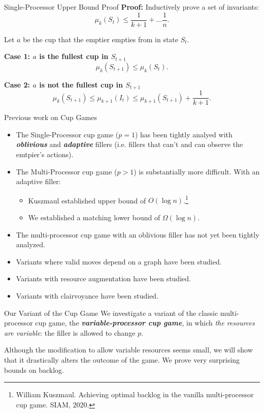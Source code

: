 \documentclass[xcolor=x11names, svgnames, rgb]{beamer}
\newcommand{\defn}[1]       {{\textit{\textbf{\boldmath #1}}}}
\begin{document}
\begin{frame}[t]{Single-Processor Upper Bound Proof}
  \textbf{Proof:}
  Inductively prove a set of invariants: 
    $$\mu_k(S_t) \le \frac{1}{k+1} + \ldots \frac{1}{n}.$$

  \vspace{0.25cm}
  Let $a$ be the cup that the emptier empties from in state $S_{t}$.

  \vspace{0.25cm}
  \textbf{Case 1: $a$ is the fullest cup in $S_{t+1}$}\\
  $$\mu_k(S_{t+1}) \le \mu_k(S_t).$$

  \vspace{0.25cm}
  \textbf{Case 2: $a$ is not the fullest cup in $S_{t+1}$}
  $$\mu_k(S_{t+1}) \le \mu_{k+1}(I_t) \le \mu_{k+1}(S_{t+1}) + \frac{1}{k+1}.$$
\end{frame}

\begin{frame}[t]{Previous work on Cup Games}
  \begin{itemize}
    \item The Single-Processor cup game ($p=1$) has been tightly analyed with
      \defn{oblivious} and \defn{adaptive} fillers (i.e. fillers that can't and
      can observe the emtpier's actions).
    \item The Multi-Processor cup game ($p>1$) is substantially more difficult. With an adaptive filler:
      \begin{itemize}
        \item Kuszmaul established upper bound of $O(\log n)$.\footnote{\tiny\color{blue}William Kuszmaul. Achieving optimal backlog in the vanilla multi-processor cup game. SIAM, 2020.}
        \item We established a matching lower bound of $\Omega(\log n)$.
      \end{itemize}
    \item The multi-processor cup game with an oblivious filler has not yet
      been tightly analyzed.
    \item Variants where valid moves depend on a graph have been studied.
    \item Variants with resource augmentation have been studied.
    \item Variants with clairvoyance have been studied.
  \end{itemize}
\end{frame}

\begin{frame}[t]{Our Variant of the Cup Game}
We investigate a variant of the classic multi-processor cup game,
the \defn{variable-processor cup game}, in which \emph{the resources are variable}:
the filler is allowed to change $p$.

\vspace{1cm}
Although the modification to allow variable resources seems small, we will
show that it drastically alters the outcome of the game. We prove very surprising bounds on backlog.
\end{frame}
\end{document}
